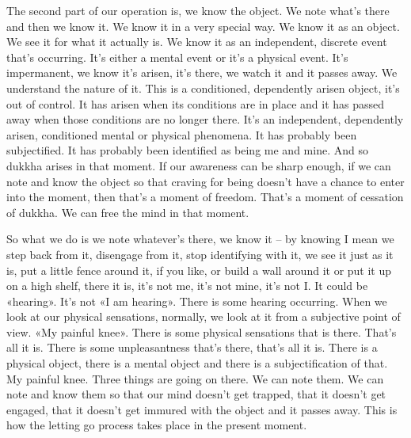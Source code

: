 \documentclass[letterpaper,10pt,english]{sphinxmanual}
\begin{document}
\sphinxAtStartPar
The second part of our operation is, we know the object. We note what’s
there and then we know it. We know it in a very special way. We know it as
an object. We see it for what it actually is. We know it as an independent,
discrete  event  that’s  occurring.  It’s  either  a  mental  event  or  it’s  a  physical
event. It’s impermanent, we know it’s arisen, it’s there, we watch it and it
  passes away. We understand the nature of it. This is a conditioned, dependently arisen object, it’s out of control. It has arisen when its conditions are
in place and it has passed away when those conditions are no longer there.
It’s an independent, dependently arisen, conditioned mental or physical phenomena. It has probably been subjectified. It has probably been identified as
being me and mine. And so dukkha arises in that moment. If our awareness
can be sharp enough, if we can note and know the object so that craving for
being doesn’t have a chance to enter into the moment, then that’s a moment
of freedom. That’s a moment of cessation of dukkha. We can free the mind
in that moment.

\sphinxAtStartPar
So what we do is we note whatever’s there, we know it – by knowing
I  mean  we  step  back  from  it,  disengage  from  it,  stop  identifying  with  it,
we see it just as it is, put a little fence around it, if you like, or build a wall
around it or put it up on a high shelf, there it is, it’s not me, it’s not mine, it’s
not I. It could be «hearing». It’s not «I am hearing». There is some hearing
occurring. When we look at our physical sensations, normally, we look at it
from a subjective point of view. «My painful knee». There is some physical
sensations that is there. That’s all it is. There is some unpleasantness that’s
there, that’s all it is. There is a physical object, there is a mental object and
there is a subjectification of that. My painful knee. Three things are going
on there. We can note them. We can note and know them so that our mind
doesn’t get trapped, that it doesn’t get engaged, that it doesn’t get immured
with the object and it passes away. This is how the letting go process takes
place in the present moment.
\end{document}
